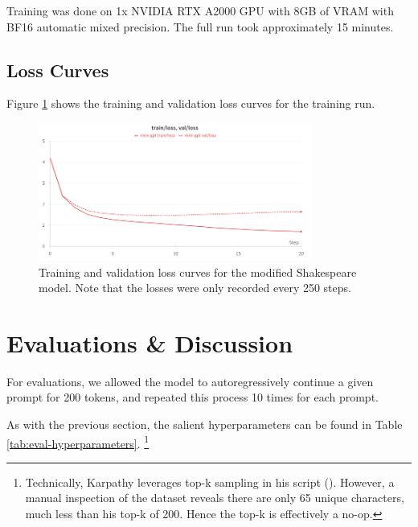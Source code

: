 \documentclass{article} %
\theoremstyle{definition}
\begin{document}
Training was done on 1x NVIDIA RTX A2000 GPU with 8GB of VRAM 
with BF16 automatic mixed precision. The full run took approximately 15 minutes.

\subsection{Loss Curves}

Figure \ref{fig:loss_curves} shows the training and validation loss curves
for the training run. 

\begin{figure}[h]
    \centering
    \includegraphics[width=0.8\textwidth, height=0.25\textheight]{images/loss_curves.png}
    \caption{Training and validation loss curves for the modified Shakespeare model.  Note that the losses were only recorded every 250 steps.}
    \label{fig:loss_curves}
\end{figure}

\section{Evaluations \& Discussion}

For evaluations, we allowed the model to autoregressively continue a given prompt
for 200 tokens, and repeated this process 10 times for each prompt.

As with the previous section, the salient hyperparameters can be found in 
Table \ref{tab:eval-hyperparameters}. \footnote{
    Technically, Karpathy leverages top-k sampling in his script (\cite{nanoGPT}).
    However, a manual inspection of the dataset reveals there are only 65 unique characters,
    much less than his top-k of 200. Hence the top-k is effectively a no-op.
}
\end{document}
